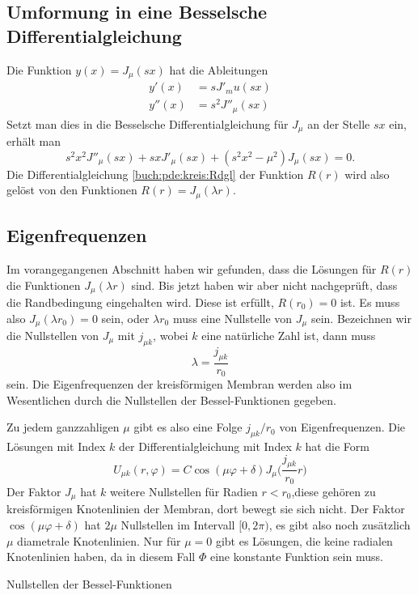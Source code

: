 \subsection{Umformung in eine Besselsche Differentialgleichung}
Die Funktion $y(x) = J_\mu(sx)$ hat die Ableitungen
\begin{align*}
y'(x) &= sJ'_mu(sx)      
\\
y''(x) &= s^2J''_\mu(sx)
\end{align*}
Setzt man dies in die Besselsche Differentialgleichung für $J_\mu$ an
der Stelle $sx$ ein, erhält man
\[
s^2x^2 J''_\mu(sx) + sx J'_\mu(sx) + (s^2x^2 -\mu^2) J_\mu(sx) = 0.
\]
Die Differentialgleichung \eqref{buch:pde:kreis:Rdgl} der Funktion $R(r)$
wird also gelöst von den Funktionen $R(r) = J_\mu(\lambda r)$.

\subsection{Eigenfrequenzen}
Im vorangegangenen Abschnitt haben wir gefunden, dass die Lösungen
für $R(r)$ die Funktionen $J_\mu(\lambda r)$ sind.
Bis jetzt haben wir aber nicht nachgeprüft, dass die Randbedingung
eingehalten wird. 
Diese ist erfüllt, $R(r_0)=0$ ist.
Es muss also
$J_\mu(\lambda r_0)=0$ sein, oder $\lambda r_0$ muss eine
Nullstelle von $J_{\mu}$ sein.
Bezeichnen wir die Nullstellen von $J_\mu$ mit $j_{\mu k}$, wobei $k$
eine natürliche Zahl ist, dann muss
\[
\lambda = \frac{j_{\mu k}}{r_0}
\]
sein.
Die Eigenfrequenzen der kreisförmigen Membran werden also im Wesentlichen
durch die Nullstellen der Bessel-Funktionen gegeben.

Zu jedem ganzzahligen $\mu$ gibt es also eine Folge $j_{\mu k}/r_0$  von
Eigenfrequenzen. 
Die Lösungen mit Index $k$ der Differentialgleichung mit Index $k$ hat
die Form
\[
U_{\mu k}(r,\varphi)
=
C \cos(\mu \varphi+\delta)
J_{\mu}\biggl(
\frac{j_{\mu k}}{r_0}r
\biggr)
\]
Der Faktor $J_{\mu}$ hat $k$ weitere Nullstellen für Radien $r<r_0$,diese
gehören zu kreisförmigen Knotenlinien der Membran, dort bewegt sie sich
nicht.
Der Faktor $\cos(\mu\varphi+\delta)$ hat $2\mu$ Nullstellen im Intervall
$[0,2\pi)$, es gibt also noch zusätzlich $\mu$ diametrale Knotenlinien.
Nur für $\mu=0$ gibt es Lösungen, die keine radialen Knotenlinien haben,
da in diesem Fall $\Phi$ eine konstante Funktion sein muss.

\begin{table}
\centering

\caption{Nullstellen der Bessel-Funktionen
\label{buch:pde:kreis:table:besselzeros}}
\end{table}

